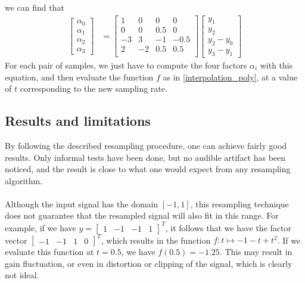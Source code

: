 \documentclass[letterpaper]{article}
\theoremstyle{definition}
\theoremstyle{remark}
\theoremstyle{plain}
\begin{document}
we can find that
\begin{align}
\begin{bmatrix}
	\alpha_0\\\alpha_1\\\alpha_2\\\alpha_3
\end{bmatrix}
&=
\begin{bmatrix}
	 1 &  0 &   0 &  0   \\
	 0 &  0 & 0.5 &  0   \\
	-3 &  3 &  -1 & -0.5 \\
	 2 & -2 & 0.5 &  0.5 \\
\end{bmatrix}
\begin{bmatrix}
	y_1\\y_2\\y_2-y_0\\y_3-y_1
\end{bmatrix}
\end{align}
For each pair of samples, we just have to compute the four factors \(\alpha_i\)
with this equation, and then evaluate the function \(f\) as in
\eqref{interpolation_poly}, at a value of \(t\) corresponding to the new
sampling rate.

\subsection{Results and limitations}
By following the described resampling procedure, one can achieve fairly good
results. Only informal tests have been done, but no audible artifact has been
noticed, and the result is close to what one would expect from any resampling
algorithm.

\paragraph{}
Although the input signal has the domain \([-1,1]\), this resampling technique
does not guarantee that the resampled signal will also fit in this range. For
example, if we have
\(y=\begin{bmatrix}1&-1&-1&1\end{bmatrix}^T\), it follows
that we have the factor vector
\(\begin{bmatrix}-1&-1&1&0\end{bmatrix}^T\), which results
in the function \(f:t\mapsto -1-t+t^2\). If we evaluate this function at
\(t=0.5\), we have \(f(0.5)=-1.25\).  This may result in gain fluctuation, or
even in distortion or clipping of the signal, which is clearly not ideal.
\end{document}
